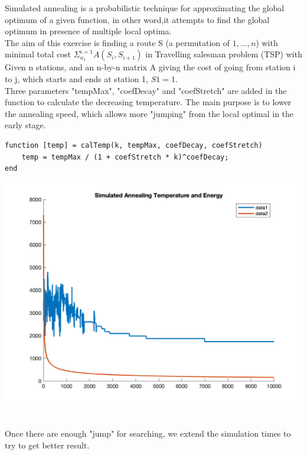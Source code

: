 Simulated annealing is a probabilistic technique for approximating the global optimum of a given function, in other word,it attempts to find the global optimum in presence of multiple local optima.\\
The aim of this exercise is finding a route S (a permutation of $1, . . . , n$) with minimal total cost $\Sigma^{i=1}_{n_1}A(S_{i},S_{i+1})$ in Travelling salesman problem (TSP) with Given n stations, and an n-by-n matrix A giving the cost of going
from station i to j, which starts and ends at station 1, $S1 = 1$.\\

Three parameters "tempMax", "coefDecay" and "coefStretch" are added in the function to calculate the decreasing temperature. The main purpose is to lower the annealing speed, which allows more "jumping" from the local optimal in the early stage.

\begin{lstlisting}
function [temp] = calTemp(k, tempMax, coefDecay, coefStretch)
    temp = tempMax / (1 + coefStretch * k)^coefDecay;
end
\end{lstlisting}

\begin{center}
    \includegraphics[scale=0.5]{Figures/figure7_3.png}\\
\end{center}\\

Once there are enough "jump" for searching, we extend the simulation times to try to get better result.

